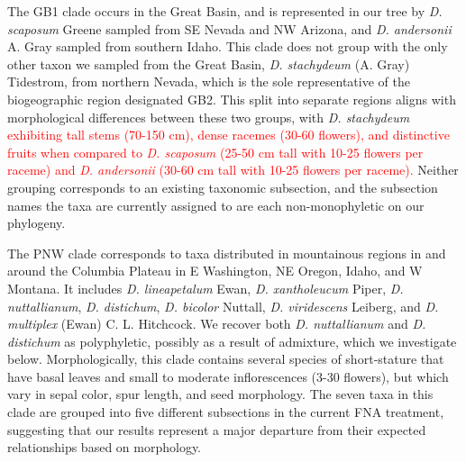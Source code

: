 \documentclass[11pt]{article}
\begin{document}
The GB1 clade occurs in the Great Basin, and is represented in our tree
by \emph{D. scaposum} Greene sampled from SE Nevada and NW Arizona, and 
\emph{D. andersonii} A. Gray sampled from southern Idaho.
This clade does not group with the only other taxon we sampled from the Great
Basin, \emph{D. stachydeum} (A. Gray) Tidestrom, from northern Nevada, which is the sole representative of the biogeographic region designated GB2. 
% 
This split into separate regions aligns with morphological differences between these
two groups, with \textit{D. stachydeum} \textcolor{red}{exhibiting tall stems (70-150 cm), dense racemes (30-60 flowers), and distinctive fruits when compared to \textit{D. scaposum} (25-50 cm tall with 10-25 flowers per raceme) and \textit{D. andersonii} (30-60 cm tall with 10-25 flowers per raceme).} 
% 
Neither grouping corresponds to an existing taxonomic subsection, and the 
subsection names the taxa are currently assigned to are each non-monophyletic on 
our phylogeny.

% 
The PNW clade corresponds to taxa distributed in mountainous regions in and around the Columbia
Plateau in E Washington, NE Oregon, Idaho, and W Montana. It includes \emph{D. lineapetalum} Ewan, 
\emph{D. xantholeucum} Piper, \emph{D. nuttallianum}, \emph{D. distichum}, \emph{D. bicolor} Nuttall, 
\emph{D. viridescens} Leiberg, and \emph{D. multiplex} (Ewan) C. L. Hitchcock. We recover both \emph{D. nuttallianum}
and \emph{D. distichum} as polyphyletic, possibly as a result of admixture, which we
investigate below. 
Morphologically, this clade contains several species of short‑stature that have basal
leaves and small to moderate inflorescences (3-30 flowers), but which vary in sepal
color, spur length, and seed morphology.
% 
The seven taxa in this clade are grouped into five different subsections in the 
current FNA treatment, suggesting that our results represent a major departure from
their expected relationships based on morphology.
\end{document}
